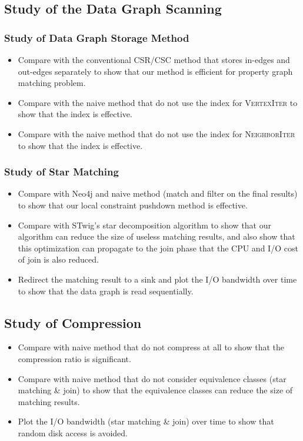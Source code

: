\subsection{Study of the Data Graph Scanning}
\subsubsection{Study of Data Graph Storage Method}
\begin{itemize}[noitemsep]
\item Compare with the conventional CSR/CSC method that stores in-edges and out-edges separately to show that our method is efficient for property graph matching problem.
\item Compare with the naive method that do not use the index for \textsc{VertexIter} to show that the index is effective.
\item Compare with the naive method that do not use the index for \textsc{NeighborIter} to show that the index is effective.
\end{itemize}
\subsubsection{Study of Star Matching}
\begin{itemize}[noitemsep]
\item Compare with Neo4j and naive method (match and filter on the final results) to show that our local constraint pushdown method is effective.
\item Compare with STwig's star decomposition algorithm to show that our algorithm can reduce the size of useless matching results, and also show that this optimization can propagate to the join phase that the CPU and I/O cost of join is also reduced.
\item Redirect the matching result to a sink and plot the I/O bandwidth over time to show that the data graph is read sequentially.
\end{itemize}
\subsection{Study of Compression}
\begin{itemize}[noitemsep]
\item Compare with naive method that do not compress at all to show that the compression ratio is significant.
\item Compare with naive method that do not consider equivalence classes (star matching \& join) to show that the equivalence classes can reduce the size of matching results.
\item Plot the I/O bandwidth (star matching \& join) over time to show that random disk access is avoided.
\end{itemize}
